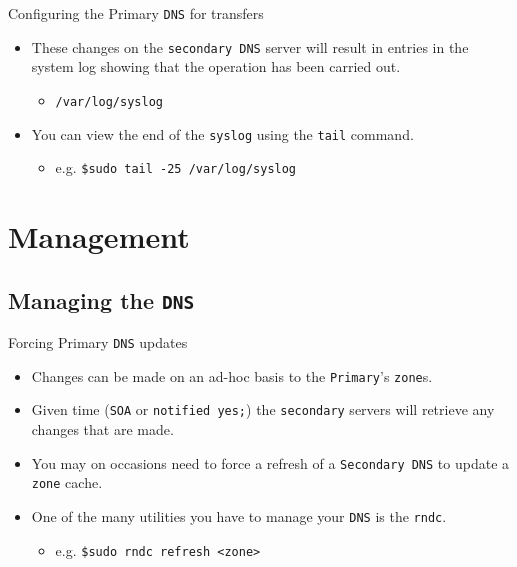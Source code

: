 \documentclass[xcolor=table,aspectratio=169]{beamer}
\begin{document}
\begin{frame}{Configuring the Primary \texttt{DNS} for transfers}
  \begin{itemize}
    \item These changes on the \texttt{secondary DNS} server will result in entries in the system log showing that the operation has been carried out.
      \begin{itemize}
        \item \texttt{/var/log/syslog}
      \end{itemize}
    \item You can view the end of the \texttt{syslog} using the \texttt{tail} command.
      \begin{itemize}
        \item e.g. \texttt{\$sudo tail -25 /var/log/syslog}
      \end{itemize}
  \end{itemize}
\end{frame}

\section{Management}
\subsection{Managing the \texttt{DNS}}
\begin{frame}{Forcing Primary \texttt{DNS} updates}
  \begin{itemize}
    \item Changes can be made on an ad-hoc basis to the \texttt{Primary}'s \texttt{zone}s.
    \item Given time (\texttt{SOA} or \texttt{notified yes;}) the \texttt{secondary} servers will retrieve any changes that are made.
    \item You may on occasions need to force a refresh of a \texttt{Secondary DNS} to update a \texttt{zone} cache.
    \item One of the many utilities you have to manage your \texttt{DNS} is the \texttt{rndc}.
      \begin{itemize}
        \item e.g. \texttt{\$sudo rndc refresh <zone>}
      \end{itemize}
  \end{itemize}
\end{frame}
\end{document}

